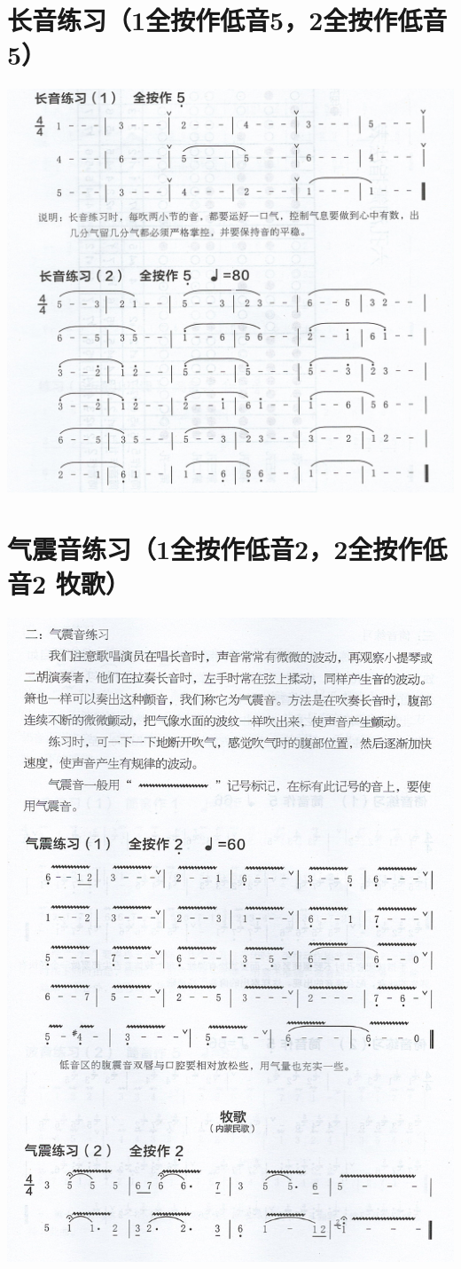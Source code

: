 \documentclass[cn,pad,chinese,chinesefont=nofont]{elegantbook}
\begin{document}
\section{长音练习（1全按作低音5，2全按作低音5）}
\includegraphics[width=\textwidth]{dongxiao/Scan 7.jpeg}

\section{气震音练习（1全按作低音2，2全按作低音2 牧歌）}
\includegraphics[height=\textheight]{dongxiao/Scan 8.jpeg}
\end{document}
